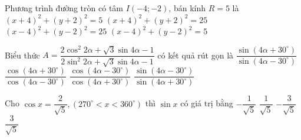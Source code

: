 \begin{ex}%
	Phương trình đường tròn có tâm $I(-4;-2)$, bán kính $R= 5$ là
	\choice 
	{ $(x+4)^2+(y+2)^2=5$ }
	{ \True $(x+4)^2+(y+2)^2=25$}
	{  $(x-4)^2+(y-2)^2=25$}
	{ $(x-4)^2+(y-2)^2=5$}
\end{ex} 

\begin{ex}%
	Biểu thức 
	$ A=\dfrac{2 {\cos^2 {2\alpha} } + \sqrt{3} \sin{4\alpha} -1}{2 {\sin^2 {2\alpha} } + \sqrt{3} \sin{4\alpha} -1} $
	có kết quả rút gọn là
	\choice 
	{\True $ \dfrac{\sin{ (4\alpha +30^\circ) }}{\sin{ (4\alpha -30^\circ ) }} $ }
	{   $ \dfrac{\cos{ (4\alpha +30^\circ) }}{\cos{ (4\alpha -30^\circ ) }} $}
	{  $ \dfrac{\cos{ (4\alpha -30^\circ) }}{\cos{ (4\alpha +30^\circ ) }} $  }
	{  $ \dfrac{\sin{ (4\alpha -30^\circ) }}{\sin{ (4\alpha +30^\circ ) }} $}
\end{ex} 

\begin{ex}%
	Cho $\cos x =\dfrac{2}{\sqrt{5} } , (270^\circ< x< 360^\circ)$  thì $\sin x$ có giá trị bằng
	\choice 
	{\True $-\dfrac{1}{\sqrt{5}}$ }
	{  $\dfrac{1}{\sqrt{5}}$}
	{  $-\dfrac{3}{\sqrt{5}}$}
	{ $\dfrac{3}{\sqrt{5}}$}
\end{ex} 

